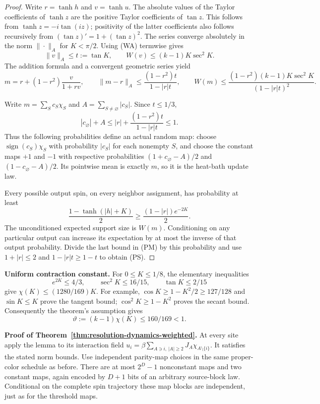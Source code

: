 \begin{proof}
Write \(r=\tanh h\) and \(v=\tanh u\). The absolute values of
the Taylor coefficients of \(\tanh z\) are the positive Taylor
coefficients of \(\tan z\). This follows from
\(\tanh z=-i\tan(iz)\); positivity of the latter coefficients also
follows recursively from \((\tan z)'=1+(\tan z)^2\). The series
converge absolutely in the norm \(\|\cdot\|_A\) for \(K<\pi/2\).
Using (WA) termwise gives
\[
 \|v\|_A\le t:=\tan K,
 \qquad W(v)\le(k-1)K\sec^2 K.
\]
The addition formula and a convergent geometric series yield
\[
 m=r+(1-r^2)\frac{v}{1+rv},\qquad
 \|m-r\|_A\le\frac{(1-r^2)t}{1-|r|t},\qquad
 W(m)\le\frac{(1-r^2)(k-1)K\sec^2K}{(1-|r|t)^2}.
 \tag{PM}
\]

Write \(m=\sum_S c_S\chi_S\) and
\(A=\sum_{S\ne\varnothing}|c_S|\). Since \(t\le1/3\),
\[
 |c_\varnothing|+A
 \le |r|+\frac{(1-r^2)t}{1-|r|t}\le1.
\]
Thus the following probabilities define an actual random map:
choose \(\operatorname{sign}(c_S)\chi_S\) with probability
\(|c_S|\) for each nonempty \(S\), and choose the constant maps
\(+1\) and \(-1\) with respective probabilities
\((1+c_\varnothing-A)/2\) and
\((1-c_\varnothing-A)/2\). Its pointwise mean is exactly \(m\),
so it is the heat-bath update law.

Every possible output spin, on every neighbor assignment, has
probability at least
\[
 \frac{1-\tanh(|h|+K)}2
 \ge\frac{(1-|r|)e^{-2K}}2.
\]
The unconditioned expected support size is \(W(m)\). Conditioning
on any particular output can increase its expectation by at most the
inverse of that output probability. Divide the last bound in (PM) by
this probability and use \(1+|r|\le2\) and
\(1-|r|t\ge1-t\) to obtain (PS).
\end{proof}

\textbf{Uniform contraction constant.}
For \(0\le K\le1/8\), the elementary inequalities
\[
 e^{2K}\le4/3,\qquad \sec^2K\le16/15,
 \qquad\tan K\le2/15
\]
give \(\chi(K)\le(1280/169)K\). For example,
\(\cos K\ge1-K^2/2\ge127/128\) and \(\sin K\le K\)
prove the tangent bound; \(\cos^2K\ge1-K^2\) proves the secant
bound. Consequently the theorem's assumption gives
\[
 \vartheta:=(k-1)\chi(K)\le160/169<1.
 \tag{PC}
\]

\textbf{Proof of Theorem~\ref{thm:resolution-dynamics-weighted}.}
At every site apply the lemma to its interaction field
\(u_i=\beta\sum_{A\ni i,\,|A|\ge2}J_A\chi_{A\setminus\{i\}}\).
It satisfies the stated norm bounds. Use independent parity-map
choices in the same proper-color schedule as before. There are at
most \(2^D-1\) nonconstant maps and two constant maps, again encoded
by \(D+1\) bits of an arbitrary source-block law. Conditional on the
complete spin trajectory these map blocks are independent, just as
for the threshold maps.

